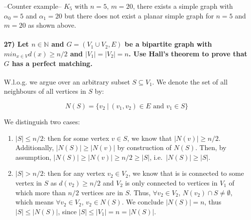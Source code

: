 \documentclass[
]{article}
\begin{document}
--Counter example-- \(K_5\) with \(n=5\), \(m=20\), there exists a
simple graph with \(\alpha_0 = 5\) and \(\alpha_1 = 20\) but there does
not exist a planar simple graph for \(n=5\) and \(m=20\) as shown above.

\hypertarget{let-n-in-mathbbn-and-g-v_1cup-v_2e-be-a-bipartite-graph-with-min_x-in-v-dx-geq-n2-and-v_1-v_2-n.-use-halls-theorem-to-prove-that-g-has-a-perfect-matching.}{%
\paragraph{\texorpdfstring{27) Let \(n \in \mathbb{N}\) and
\(G = (V_1\cup V_2,E)\) be a bipartite graph with
\(min_{x \in V} d(x) \geq n/2\) and \(|V_1| = |V_2| = n\). Use Hall's
theorem to prove that \(G\) has a perfect
matching.}{27) Let n \textbackslash in \textbackslash mathbb\{N\} and G = (V\_1\textbackslash cup V\_2,E) be a bipartite graph with min\_\{x \textbackslash in V\} d(x) \textbackslash geq n/2 and \textbar V\_1\textbar{} = \textbar V\_2\textbar{} = n. Use Hall's theorem to prove that G has a perfect matching.}}\label{let-n-in-mathbbn-and-g-v_1cup-v_2e-be-a-bipartite-graph-with-min_x-in-v-dx-geq-n2-and-v_1-v_2-n.-use-halls-theorem-to-prove-that-g-has-a-perfect-matching.}}

W.l.o.g. we argue over an arbitrary subset \(S \subseteq V_1\). We
denote the set of all neighbours of all vertices in \(S\) by:

\[
N(S) = \{v_2 \ | \ (v_1,v_2) \in E \text{ and } v_1 \in S\}
\]

We distinguish two cases:

\begin{enumerate}
\def\labelenumi{\arabic{enumi})}
\item
  \(|S| \leq n/2\): then for some vertex \(v \in S\), we know that
  \(|N(v)| \geq n/2\). Additionally, \(|N(S)| \geq |N(v)|\) by
  construction of \(N(S)\). Then, by assumption,
  \(|N(S)| \geq |N(v)| \geq n/2 \geq |S|\), i.e.~\(|N(S)| \geq |S|\).
\item
  \(|S| > n/2\): then for any vertex \(v_2 \in V_2\), we know that is is
  connected to some vertex in \(S\) as \(d(v_2) \geq n/2\) and \(V_2\)
  is only connected to vertices in \(V_1\) of which more than \(n/2\)
  vertices are in \(S\). Thus, \(\forall v_2 \in V_2\),
  \(N(v_2) \cap S \neq \emptyset\), which means \(\forall v_2 \in V_2\),
  \(v_2 \in N(S)\). We conclude \(|N(S)| = n\), thus
  \(|S| \leq |N(S)|\), since \(|S| \leq |V_1| = n = |N(S)|\).
\end{enumerate}
\end{document}

